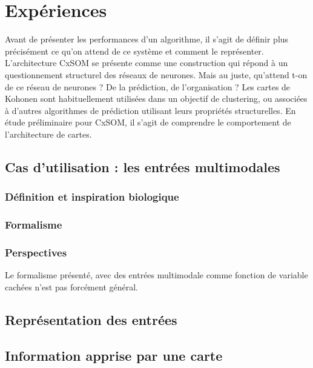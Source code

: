 \chapter{Expériences}
\graphicspath{{04-Analyse/}}
Avant de présenter les performances d'un algorithme, il s'agit de définir plus précisément ce qu'on attend de ce système et comment le représenter. L'architecture CxSOM se présente comme une construction qui répond à un questionnement structurel des réseaux de neurones. Mais au juste, qu'attend t-on de ce réseau de neurones ? De la prédiction, de l'organisation ? Les cartes de Kohonen sont habituellement utilisées dans un objectif de clustering, ou associées à d'autres algorithmes de prédiction utilisant leurs propriétés structurelles. En étude préliminaire pour CxSOM, il s'agit de comprendre le comportement de l'architecture de cartes.

\section{Cas d'utilisation : les entrées multimodales}

\subsection{Définition et inspiration biologique}



\subsection{Formalisme}



\subsection{Perspectives}

Le formalisme présenté, avec des entrées multimodale comme fonction de variable cachées n'est pas forcément général.  

\section{Représentation des entrées}



\section{Information apprise par une carte}

